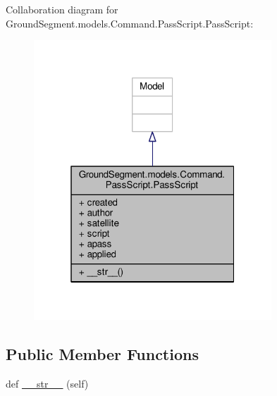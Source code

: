 Collaboration diagram for Ground\+Segment.\+models.\+Command.\+Pass\+Script.\+Pass\+Script\+:\nopagebreak
\begin{figure}[H]
\begin{center}
\leavevmode
\includegraphics[width=253pt]{class_ground_segment_1_1models_1_1_command_1_1_pass_script_1_1_pass_script__coll__graph}
\end{center}
\end{figure}
\subsection*{Public Member Functions}
\begin{DoxyCompactItemize}
\item 
def \hyperlink{class_ground_segment_1_1models_1_1_command_1_1_pass_script_1_1_pass_script_a4dcb308f74810861597d708fa7446255}{\+\_\+\+\_\+str\+\_\+\+\_\+} (self)
\end{DoxyCompactItemize}
